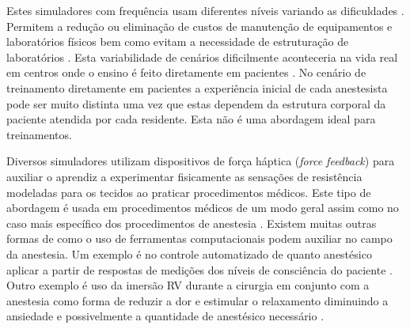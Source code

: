 Estes simuladores com frequência usam diferentes níveis variando as dificuldades \cite{Ullrich2012}. Permitem a redução ou eliminação de custos de manutenção de equipamentos e laboratórios físicos bem como evitam a necessidade de estruturação de laboratórios \cite{Silva2018}. 
Esta variabilidade de cenários dificilmente aconteceria na vida real em centros onde o ensino é feito diretamente em pacientes \cite{Udani2015}. No cenário de treinamento diretamente em pacientes a experiência inicial de cada anestesista pode ser muito distinta uma vez que estas dependem da estrutura corporal da paciente atendida por cada residente. Esta não é uma abordagem ideal para treinamentos. 

Diversos simuladores utilizam dispositivos de força háptica (\textit{force feedback}) para auxiliar o aprendiz a experimentar fisicamente as sensações de resistência modeladas para os tecidos ao praticar procedimentos médicos. Este tipo de abordagem é usada em procedimentos médicos de um modo geral \cite{Escobar-Castillejos2016, Patel2021} assim como no caso mais específico dos procedimentos de anestesia \cite{Vaughan2013, Collaco2021}. Existem muitas outras formas de como o uso de ferramentas computacionais podem auxiliar no campo da anestesia. Um exemplo é no controle automatizado de quanto anestésico aplicar a partir de respostas de medições dos níveis de consciência do paciente \cite{Mendez2009}. Outro exemplo é uso da imersão \acrshort{RV} durante a cirurgia em conjunto com a anestesia como forma de reduzir a dor e estimular o relaxamento diminuindo a ansiedade e possivelmente a quantidade de anestésico necessário \cite{Eijlers2019}.

